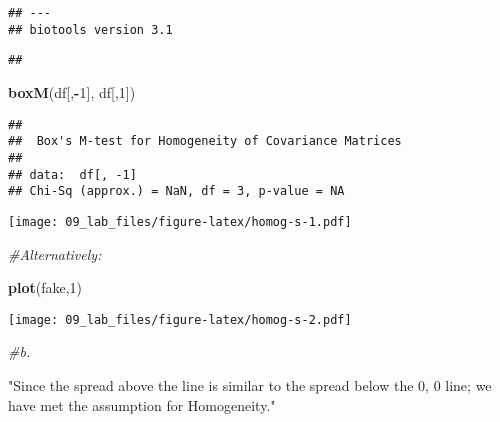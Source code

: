 \documentclass[
]{article}
\newenvironment{Shaded}{\begin{snugshade}}{\end{snugshade}}
\newcommand{\CommentTok}[1]{\textcolor[rgb]{0.56,0.35,0.01}{\textit{#1}}}
\newcommand{\DataTypeTok}[1]{\textcolor[rgb]{0.13,0.29,0.53}{#1}}
\newcommand{\DecValTok}[1]{\textcolor[rgb]{0.00,0.00,0.81}{#1}}
\newcommand{\KeywordTok}[1]{\textcolor[rgb]{0.13,0.29,0.53}{\textbf{#1}}}
\newcommand{\NormalTok}[1]{#1}
\newcommand{\OperatorTok}[1]{\textcolor[rgb]{0.81,0.36,0.00}{\textbf{#1}}}
\newcommand{\StringTok}[1]{\textcolor[rgb]{0.31,0.60,0.02}{#1}}
\begin{document}
\begin{verbatim}
## ---
## biotools version 3.1
\end{verbatim}

\begin{verbatim}
## 
\end{verbatim}

\begin{Shaded}
\begin{Highlighting}[]
\KeywordTok{boxM}\NormalTok{(df[,}\OperatorTok{-}\DecValTok{1}\NormalTok{], df[,}\DecValTok{1}\NormalTok{])}
\end{Highlighting}
\end{Shaded}

\begin{verbatim}
## 
##  Box's M-test for Homogeneity of Covariance Matrices
## 
## data:  df[, -1]
## Chi-Sq (approx.) = NaN, df = 3, p-value = NA
\end{verbatim}

\begin{Shaded}
\end{Shaded}

\texttt{[image: 09\_lab\_files/figure-latex/homog-s-1.pdf]}

\begin{Shaded}
\begin{Highlighting}[]
\CommentTok{#Alternatively:}

\KeywordTok{plot}\NormalTok{(fake,}\DecValTok{1}\NormalTok{)}
\end{Highlighting}
\end{Shaded}

\texttt{[image: 09\_lab\_files/figure-latex/homog-s-2.pdf]}

\begin{Shaded}
\begin{Highlighting}[]
\CommentTok{#b.}

\StringTok{"Since the spread above the line is similar to the spread below the 0, 0 line; we have met the assumption for Homogeneity."}
\end{Highlighting}
\end{Shaded}
\end{document}
